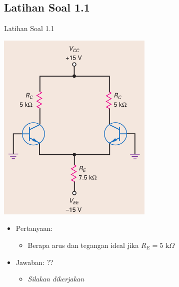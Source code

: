 \documentclass[aspectratio=169]{beamer}
\begin{document}
\subsection{Latihan Soal 1.1}
\begin{frame}{Latihan Soal 1.1}
	\begin{multicols}{2}
		\begin{center}
			\includegraphics[width=0.6\textheight]{gambar/01.latihan_soal_1a}
		\end{center}
		\columnbreak
		\begin{itemize}
			\item Pertanyaan:
			\begin{itemize}
				\item Berapa arus dan tegangan ideal jika $ R_E = 5 \text{ k}\Omega $
			\end{itemize}
			\item Jawaban: ??
			\begin{itemize}
				\item \textit{Silakan dikerjakan}
			\end{itemize}
		\end{itemize}
		\vfill\null
	\end{multicols}
\end{frame}
\end{document}
